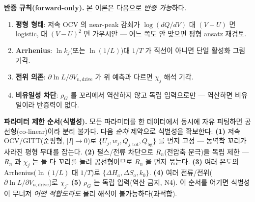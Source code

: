 \documentclass[11pt,a4paper]{article}
\newcommand{\drive}{\mathrm{drive}}
\newcommand{\bg}{\mathrm{bg}}
\newcommand{\tot}{\mathrm{tot}}
\begin{document}
\textbf{반증 규칙(forward-only).} 본 이론은 다음으로 \emph{반증 가능}하다.
\begin{enumerate}[label=(N\arabic*),leftmargin=2.4em]
\item \textbf{평형 형태}: 저속 OCV 의 near-peak 감쇠가 $\log(dQ/dV)$ 대 $(V-U)$ 면 logistic, 대 $(V-U)^2$
  면 가우시안 — 어느 쪽도 안 맞으면 평형 ansatz 재검토.
\item \textbf{Arrhenius}: $\ln k_j$(또는 $\ln(1/L)$)대 $1/T$ 가 직선이 아니면 단일 활성화 그림 기각.
\item \textbf{전위 의존}: $\partial\ln L/\partial V_{n,\drive}$ 가 위 예측과 다르면 $\chi_j$ 해석 기각.
\item \textbf{비유일성 차단}: $\rho_G$ 를 꼬리에서 역산하지 않고 독립 입력으로만 — 역산하면 비유일이라
  반증력이 없다.
\end{enumerate}
\textbf{파라미터 제한 순서(식별성).} 모든 파라미터를 한 데이터에서 동시에 자유 피팅하면 공선형(co-linear)이라
분리 불가다. 다음 \emph{순차} 제약으로 식별성을 확보한다: \textbf{(1)} 저속 OCV/GITT(준평형, $|I|\to0$)로
$\{U_j,w_j,Q_{j,\tot},Q_\bg\}$ 를 먼저 고정 — 동역학 꼬리가 사라진 평형 무대를 잡는다. \textbf{(2)} 펄스/전류
차단으로 $R_n$(전압축 분극)을 독립 제한 — $R_n$ 과 $\chi_j$ 는 둘 다 꼬리를 늘려 공선형이므로 $R_n$ 을 먼저
묶는다. \textbf{(3)} 여러 온도의 Arrhenius($\ln(1/L)$ 대 $1/T$)로 $\{\Delta H_a,\Delta S_a,k_0\}$. \textbf{(4)}
여러 전류/전위($\partial\ln L/\partial V_{n,\drive}$)로 $\chi_j$. \textbf{(5)} $\rho_G$ 는 독립 입력(역산 금지,
N4). 이 순서를 어기면 식별성이 무너져 \emph{어떤 적합도라도} 물리 해석이 불가능하다(과적합).

\end{document}
